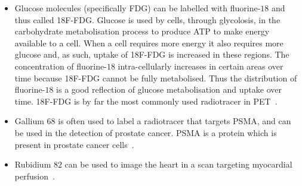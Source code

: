                 \begin{itemize}
                    \item Glucose molecules (specifically \gls{FDG}) can be labelled with fluorine-$18$ and thus called \gls{18F-FDG}. %
                    Glucose is used by cells, through glycolosis, in the carbohydrate metabolisation process to produce \gls{ATP} to make energy available to a cell. When a cell requires more energy it also requires more glucose and, as such, uptake of \gls{18F-FDG} is increased in these regions. The concentration of fluorine-$18$ intra-cellularly increases in certain areas over time because \gls{18F-FDG} cannot be fully metabolised. Thus the distribution of fluorine-$18$ is a good reflection of glucose metabolisation and uptake over time. \gls{18F-FDG} is by far the most commonly used radiotracer in \gls{PET}~\parencite{WeissBook, FDGGuidelines}.
                    
                    \item Gallium $68$ is often used to label a radiotracer that targets \gls{PSMA}, and can be used in the detection of prostate cancer. \gls{PSMA} is a protein which is present in prostate cancer cells~\parencite{Afshar-Oromieh2013PetLesions}.
                    
                    \item Rubidium $82$ can be used to image the heart in a scan targeting myocardial perfusion~\parencite{Selwyn1982}.
                \end{itemize}
            
